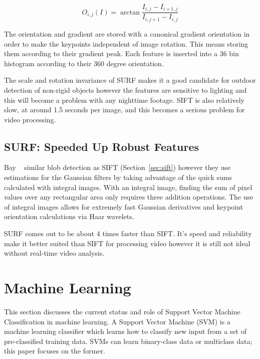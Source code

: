 \begin{equation}
    O_{i,j}(I) = \arctan{\frac{I_{i,j}-I_{i+1,j}}{I_{i,j+1}-I_{i,j}}}
    \label{eq:gradient}
\end{equation}

The orientation and gradient are stored with a canonical gradient orientation in order to make the keypoints independent of image rotation. This means storing them according to their gradient peak. Each feature is inserted into a 36 bin histogram according to their 360 degree orientation.

The scale and rotation invariance of SURF makes it a good candidate for outdoor detection of non-rigid objects however the features are sensitive to lighting and this will become a problem with any nighttime footage. SIFT is also relatively slow, at around 1.5 seconds per image, and this becomes a serious problem for video processing.


\subsection{SURF\@: Speeded Up Robust Features}
\label{sec:surf}

Bay \etal~\cite{bay_2008_speeded}\cite{bay_2006_surf} similar blob detection as SIFT (Section~\ref{sec:sift}) however they use estimations for the Gaussian filters by taking advantage of the quick sums calculated with integral images. With an integral image, finding the sum of pixel values over any rectangular area only requires three addition operations. The use of integral images allows for extremely fast Gaussian derivatives and keypoint orientation calculations via Haar wavelets.

SURF comes out to be about 4 times faster than SIFT\@. It's speed and reliability make it better suited than SIFT for processing video however it is still not ideal without real-time video analysis.


\section{Machine Learning}
\label{sec:works_machine_learning}

This section discusses the current status and role of Support Vector Machine Classification in machine learning. A Support Vector Machine (SVM) is a machine learning classifier which learns how to classify new input from a set of pre-classified training data. SVMs can learn binary-class data or multiclass data; this paper focuses on the former.


